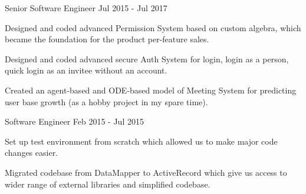 \begin{cventries}
    \cventry
    {Senior Software Engineer} %
    {} %
    {} %
    {Jul 2015 - Jul 2017} %
    {
      \begin{cvitems} %
        \item {Designed and coded advanced Permission System based on custom algebra, which became the foundation for the product per-feature sales.}
        \item {Designed and coded advanced secure Auth System for login, login as a person, quick login as an invitee without an account.}
        \item {Created an agent-based and ODE-based model of Meeting System for predicting user base growth (as a hobby project in my spare time).}
      \end{cvitems}
    }

    \cventry
    {Software Engineer} %
    {} %
    {} %
    {Feb 2015 - Jul 2015} %
    {
      \begin{cvitems} %
        \item {Set up test environment from scratch which allowed us to make major code changes easier.}
        \item {Migrated codebase from DataMapper to ActiveRecord which give us access to wider range of external libraries and simplified codebase.}
      \end{cvitems}
    }


\end{cventries}
